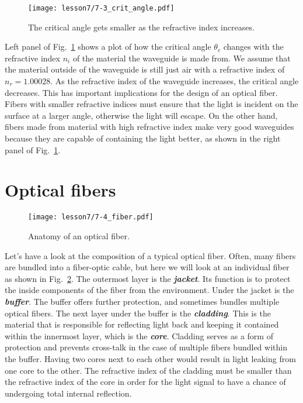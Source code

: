 \begin{figure}
    \centering
    \texttt{[image: lesson7/7-3\_crit\_angle.pdf]}
    \caption[Critical angle.]{The critical angle gets smaller as the refractive index increases.}
    \label{fig:7-3_crit_angle}
\end{figure}

Left panel of Fig.~\ref{fig:7-3_crit_angle} shows a plot of how the critical angle $\theta_c$ changes with the refractive index $n_i$ of the material the waveguide is made from.
We assume that the material outside of the waveguide is still just air with a refractive index of $n_r = 1.00028$.
As the refractive index of the waveguide increases, the critical angle decreases.
This has important implications for the design of an optical fiber.
Fibers with smaller refractive indices must ensure that the light is incident on the surface at a larger angle, otherwise the light will escape.
On the other hand, fibers made from material with high refractive index make very good waveguides because they are capable of containing the light better, as shown in the right panel of Fig.~\ref{fig:7-3_crit_angle}.


\section{Optical fibers}
\label{sec:7-4_optical fibers}

\begin{figure}[t]
    \centering
    \texttt{[image: lesson7/7-4\_fiber.pdf]}
    \caption[Anatomy of an optical fiber]{Anatomy of an optical fiber.}
    \label{fig:7-4_fiber}
\end{figure}

Let's have a look at the composition of a typical optical fiber.
Often, many fibers are bundled into a fiber-optic cable, but here we will look at an individual fiber as shown in Fig.~\ref{fig:7-4_fiber}. 
The outermost layer is the \textbf{\emph{jacket}}.
Its function is to protect the inside components of the fiber from the environment.
Under the jacket is the \textbf{\emph{buffer}}.
The buffer offers further protection, and sometimes bundles multiple optical fibers.
The next layer under the buffer is the \textbf{\emph{cladding}}.
This is the material that is responsible for reflecting light back and keeping it contained within the innermost layer, which is the \textbf{\emph{core}}.
Cladding serves as a form of protection and prevents cross-talk in the case of multiple fibers bundled within the buffer.
Having two cores next to each other would result in light leaking from one core to the other.
The refractive index of the cladding must be smaller than the refractive index of the core in order for the light signal to have a chance of undergoing total internal reflection.

